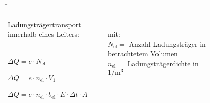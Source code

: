 \begin{frame}
	\b{

	
	\begin{columns}
	  Ladungsträgertransport innerhalb eines Leiters:\\

		\phantom{.}\\

		\phantom{text}\\
		$\Delta Q = e \cdot N_\mathrm{el} $\\

		\phantom{text}\\

		$\Delta Q = e \cdot n_\mathrm{el} \cdot V_1$\\

		\phantom{text}\\

	$\Delta Q = e \cdot n_\mathrm{el} \cdot b_\mathrm{el} \cdot E \cdot \Delta t \cdot A$

		\phantom{.}\\

		mit:\\
		$N_\mathrm{el} =$ Anzahl Ladungsträger in betrachtetem Volumen\\

		$n_\mathrm{el} = $  Ladungsträgerdichte in $1/\mathrm{m}^3$






	

		
		


		\begin{figure}[h!]
			\centering
			
			
		\end{figure}


\end{columns}}
\end{frame}
